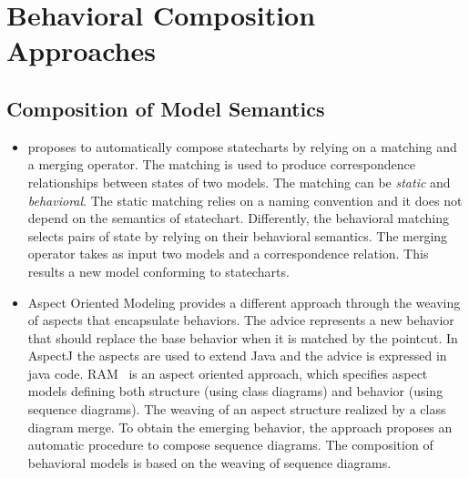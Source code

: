 \section{Behavioral Composition Approaches}


	
	\subsection{Composition of Model Semantics}
	\begin{itemize}
    
		
	\item\cite{compostatechartsbib} proposes to automatically compose statecharts by relying on a matching and a merging operator. The matching is used to produce correspondence relationships between states of two models. The matching can be \emph{static} and \emph{behavioral}. The static matching relies on a naming convention and it does not depend on the semantics of statechart. Differently, the behavioral matching selects pairs of state by relying on their behavioral semantics. The merging operator takes as input two models and a correspondence relation. This results a new model conforming to statecharts.  
		 
	\item Aspect Oriented Modeling provides a different approach through the weaving of aspects that encapsulate behaviors\cite{weavingbib}. The advice represents a new behavior that should replace the base behavior when it is matched by the pointcut. In AspectJ\cite{AspectJoverview} the aspects are used to extend Java and the advice is expressed in java code. RAM~\cite{rambib,composdbib} is an aspect oriented approach, which specifies aspect models defining both structure (using class diagrams) and behavior (using sequence diagrams). The weaving of an aspect structure realized by a class diagram merge. To obtain the emerging behavior, the approach proposes an automatic procedure to compose sequence diagrams. The composition of behavioral models is based on the weaving of sequence diagrams.
	
\end{itemize}

